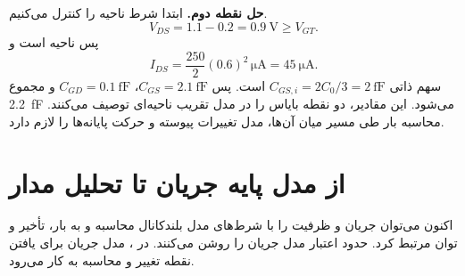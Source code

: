 \textbf{حل نقطه دوم.} ابتدا شرط ناحیه را کنترل می‌کنیم.
\[
 V_{DS}=1.1-0.2=\qty{0.9}{\volt}\ge V_{GT}.
\]
پس ناحیه  است و
\[
 I_{DS}=\frac{250}{2}(0.6)^2\,\unit{\micro\ampere}
 =\qty{45}{\micro\ampere}.
\]
سهم ذاتی \(C_{GS,i}=2C_0/3=\qty{2}{\femto\farad}\) است.
پس \(C_{GS}=\qty{2.1}{\femto\farad}\)، \(C_{GD}=\qty{0.1}{\femto\farad}\)
و مجموع \qty{2.2}{\femto\farad} می‌شود.
این مقادیر، دو نقطه بایاس را در مدل تقریب ناحیه‌ای توصیف می‌کنند.
محاسبه بار طی مسیر میان آن‌ها، مدل تغییرات پیوسته و حرکت پایانه‌ها را لازم دارد.

\section*{از مدل پایه جریان تا تحلیل مدار}
اکنون می‌توان جریان و ظرفیت را با شرط‌های مدل بلندکانال محاسبه و به بار، تأخیر
و توان مرتبط کرد. 
حدود اعتبار مدل جریان را روشن می‌کنند. در
، مدل جریان برای
یافتن نقطه تغییر و محاسبه  به کار می‌رود.
\clearpage

